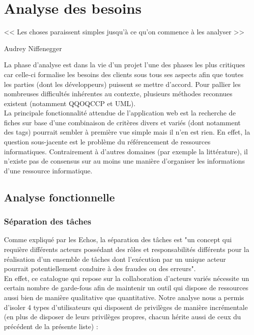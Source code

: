 
\chapter{Analyse des besoins}

\epigraph{<< Les choses paraissent simples jusqu'à ce qu'on commence à les analyser >>}{Audrey Niffenegger}

La phase d'analyse est dans la vie d'un projet l'une des phases les plus critiques car celle-ci formalise les besoins des clients sous tous ses aspects afin que toutes les parties (dont les développeurs) puissent se mettre d'accord. Pour pallier les nombreuses difficultés inhérentes au contexte, plusieurs méthodes reconnues existent (notamment \Gls{QQOQCCP} et UML). \\

La principale fonctionnalité attendue de l'application web est la recherche de \glspl{fiche} sur base d'une combinaison de critères divers et variés (dont notamment des \glspl{tag}) pourrait sembler à première vue simple mais il n'en est rien. En effet, la question sous-jacente est le problème du référencement de ressources informatiques. Contrairement à d'autres domaines (par exemple la littérature), il n'existe pas de consensus sur au moins une manière d'organiser les informations d'une ressource informatique.

\section{Analyse fonctionnelle}
\label{section:analyseFonctionnelle}

\subsection*{Séparation des tâches}

Comme expliqué par les Echos\cite{SOD}, la séparation des tâches est "un concept qui requière différents acteurs possédant des rôles et responsabilités différents pour la réalisation d’un ensemble de tâches dont l’exécution par un unique acteur pourrait potentiellement conduire à des fraudes ou des erreurs". \\


En effet, ce catalogue qui repose sur la collaboration d'acteurs variés nécessite un certain nombre de garde-fous afin de maintenir un outil qui dispose de ressources aussi bien de manière qualitative que quantitative. Notre analyse nous a permis d'isoler 4 types d'utilisateurs qui disposent de privilèges de manière incrémentale (en plus de disposer de leurs privilèges propres, chacun hérite aussi de ceux du précédent de la présente liste) :

